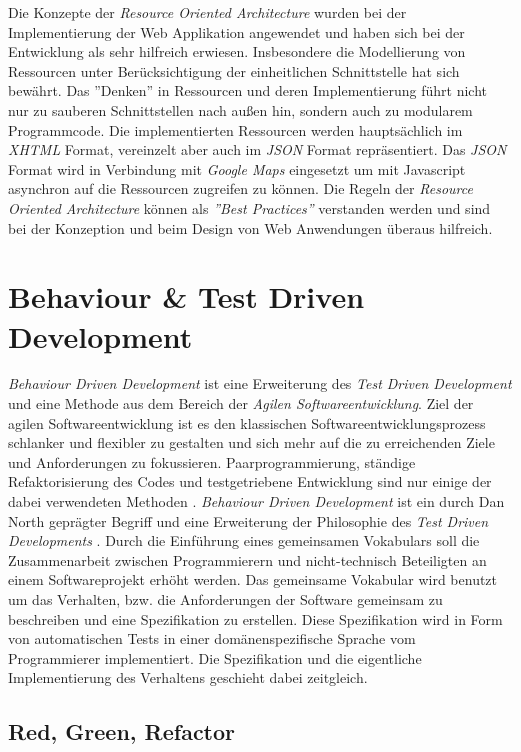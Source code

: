 Die Konzepte der \textit{Resource Oriented Architecture} wurden bei
der Implementierung der Web Applikation angewendet und haben sich bei
der Entwicklung als sehr hilfreich erwiesen. Insbesondere die
Modellierung von Ressourcen unter Berücksichtigung der einheitlichen
Schnittstelle hat sich bewährt. Das ''Denken'' in Ressourcen und deren
Implementierung führt nicht nur zu sauberen Schnittstellen nach außen
hin, sondern auch zu modularem Programmcode. Die implementierten
Ressourcen werden hauptsächlich im \textit{XHTML} Format, vereinzelt
aber auch im \textit{JSON} Format repräsentiert. Das \textit{JSON}
Format wird in Verbindung mit \textit{Google Maps} eingesetzt um mit
Javascript asynchron auf die Ressourcen zugreifen zu können. Die
Regeln der \textit{Resource Oriented Architecture} können als
\textit{''Best Practices''} verstanden werden und sind bei der
Konzeption und beim Design von Web Anwendungen überaus hilfreich.

\section{Behaviour \& Test Driven Development}

\textit{Behaviour Driven Development} ist eine Erweiterung des
\textit{Test Driven Development} und eine Methode aus dem Bereich der
\textit{Agilen Softwareentwicklung}. Ziel der agilen
Softwareentwicklung ist es den klassischen Softwareentwicklungsprozess
schlanker und flexibler zu gestalten und sich mehr auf die zu
erreichenden Ziele und Anforderungen zu
fokussieren. Paarprogrammierung, ständige Refaktorisierung des Codes
und testgetriebene Entwicklung sind nur einige der dabei verwendeten
Methoden \cite{wiki:agile}. \textit{Behaviour Driven Development} ist
ein durch Dan North geprägter Begriff und eine Erweiterung der
Philosophie des \textit{Test Driven Developments}
\cite{wiki:bdd}. Durch die Einführung eines gemeinsamen Vokabulars
soll die Zusammenarbeit zwischen Programmierern und nicht-technisch
Beteiligten an einem Softwareprojekt erhöht werden. Das gemeinsame
Vokabular wird benutzt um das Verhalten, bzw. die Anforderungen der
Software gemeinsam zu beschreiben und eine Spezifikation zu erstellen.
Diese Spezifikation wird in Form von automatischen Tests in einer
domänen\-spezifische Sprache vom Programmierer implementiert. Die
Spezifikation und die eigentliche Implementierung des Verhaltens
geschieht dabei zeitgleich.

\subsection{Red, Green, Refactor}

